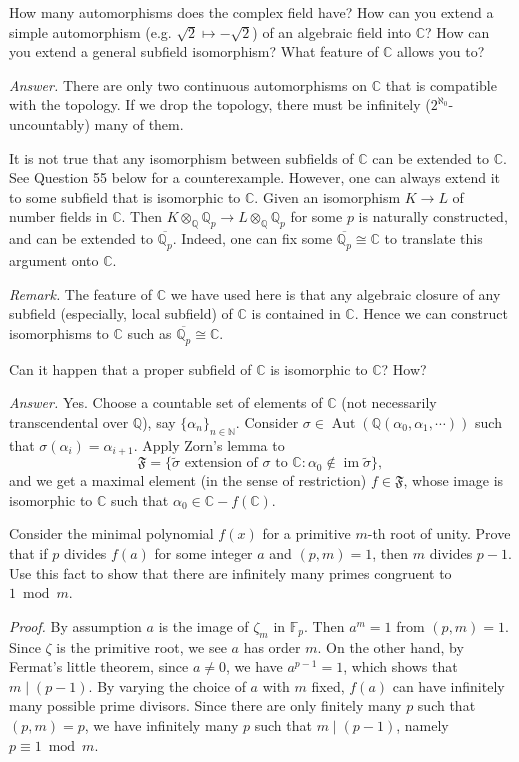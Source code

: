 \documentclass{mathproblems}
\newcommand\Q{\mathbb{Q}}
\newcommand\C{\mathbb{C}}
\newcommand\F{\mathbb{F}}
\DeclareMathOperator{\Aut}{Aut}
\begin{document}
\begin{questions}
\miquestion
{\color{blue} How many automorphisms does the complex field have? How can you extend a simple automorphism (e.g. $\sqrt{2} \mapsto-\sqrt{2}$) of an algebraic field into $\mathbb{C}$? How can you extend a general subfield isomorphism? What feature of $\mathbb{C}$ allows you to?}

\textit{Answer.} There are only two continuous automorphisms on $\C$ that is compatible with the topology. If we drop the topology, there must be infinitely ($2^{\aleph_0}$-uncountably) many of them.

It is not true that any isomorphism between subfields of $\C$ can be extended to $\C$. See Question 55 below for a counterexample. However, one can always extend it to some subfield that is isomorphic to $\C$. Given an isomorphism $K\to L$ of number fields in $\C$. Then $K\otimes_{\Q}\Q_p\to L\otimes_{\Q}\Q_p$ for some $p$ is naturally constructed, and can be extended to $\overline{\Q_p}$. Indeed, one can fix some $\overline{\Q_p}\cong \C$ to translate this argument onto $\C$.

\textit{Remark.} The feature of $\C$ we have used here is that any algebraic closure of any subfield (especially, local subfield) of $\C$ is contained in $\C$. Hence we can construct isomorphisms to $\C$ such as $\overline{\Q_p} \cong \C$.


\miquestion
{\color{blue} Can it happen that a proper subfield of $\mathbb{C}$ is isomorphic to $\mathbb{C}$? How?}

\textit{Answer.} Yes. Choose a countable set of elements of $\C$ (not necessarily transcendental over $\Q$), say $\{\alpha_n\}_{n\in \mathbb{N}}$. Consider $\sigma\in \Aut(\Q(\alpha_0,\alpha_1,\cdots))$ such that $\sigma(\alpha_i)=\alpha_{i+1}$. Apply Zorn's lemma to
$$
\mathfrak{F}=\{\widetilde{\sigma} \text{ extension of } \sigma \text{ to } \C: \alpha_0\notin \operatorname{im} \widetilde{\sigma}\},
$$
and we get a maximal element (in the sense of restriction) $f\in \mathfrak{F}$, whose image is isomorphic to $\C$ such that $\alpha_0\in \C-f(\C)$.

\miquestion
{\color{blue} Consider the minimal polynomial $f(x)$ for a primitive $m$-th root of unity. Prove that if $p$ divides $f(a)$ for some integer $a$ and $(p, m)=1$, then $m$ divides $p-1$. Use this fact to show that there are infinitely many primes congruent to $1 \bmod m$.}

\textit{Proof.} By assumption $a$ is the image of $\zeta_m$ in $\F_p$. Then $a^m=1$ from $(p,m)=1$. Since $\zeta$ is the primitive root, we see $a$ has order $m$. On the other hand, by Fermat's little theorem, since $a\neq 0$, we have $a^{p-1}=1$, which shows that $m\mid (p-1)$. By varying the choice of $a$ with $m$ fixed, $f(a)$ can have infinitely many possible prime divisors. Since there are only finitely many $p$ such that $(p,m)=p$, we have infinitely many $p$ such that $m\mid (p-1)$, namely $p\equiv 1\bmod m$.


\end{questions}
\end{document}
